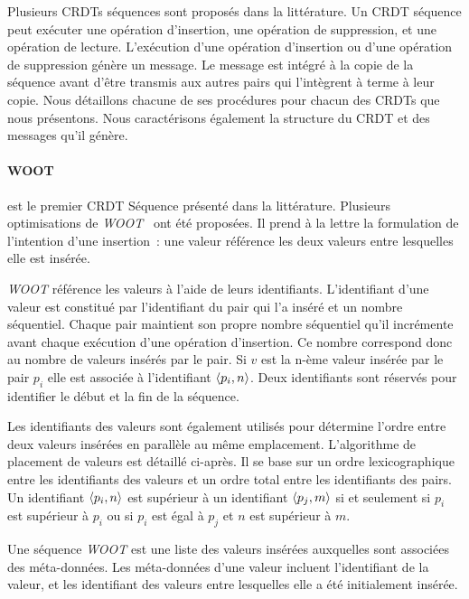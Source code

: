 Plusieurs \acp{CRDT} séquences sont proposés dans la littérature.
Un \ac{CRDT} séquence peut exécuter une opération d'insertion, une opération de suppression, et une opération de lecture.
L'exécution d'une opération d'insertion ou d'une opération de suppression génère un message.
Le message est intégré à la copie de la séquence avant d'être transmis aux autres pairs qui l'intègrent à terme à leur copie.
Nous détaillons chacune de ses procédures pour chacun des \acp{CRDT} que nous présentons.
Nous caractérisons également la structure du \ac{CRDT} et des messages qu'il génère.

\paragraph{WOOT}\autocite{oster_2006_woot} est le premier \ac{CRDT} Séquence présenté dans la littérature.
Plusieurs optimisations de \emph{WOOT}~\autocite{weiss2007wooki,ahmednacer2011evaluatingcrdts} ont été proposées.
Il prend à la lettre la formulation de l'intention d'une insertion~: une valeur référence les deux valeurs entre lesquelles elle est insérée.

\emph{WOOT} référence les valeurs à l'aide de leurs identifiants.
L'identifiant d'une valeur est constitué par l'identifiant du pair qui l'a inséré et un nombre séquentiel.
Chaque pair maintient son propre nombre séquentiel qu'il incrémente avant chaque exécution d'une opération d'insertion.
Ce nombre correspond donc au nombre de valeurs insérés par le pair.
Si $v$ est la n-ème valeur insérée par le pair $p_i$ elle est associée à l'identifiant $\tuple*{p_i, n}$.
Deux identifiants sont réservés pour identifier le début et la fin de la séquence.

Les identifiants des valeurs sont également utilisés pour détermine l'ordre entre deux valeurs insérées en parallèle au même emplacement.
L'algorithme de placement de valeurs est détaillé ci-après.
Il se base sur un ordre lexicographique entre les identifiants des valeurs et un ordre total entre les identifiants des pairs.
Un identifiant $\tuple*{p_i, n}$ est supérieur à un identifiant $\tuple*{p_j, m}$ si et seulement si $p_i$ est supérieur à $p_i$ ou si $p_i$ est égal à $p_j$ et $n$ est supérieur à $m$.

Une séquence \emph{WOOT} est une liste des valeurs insérées auxquelles sont associées des méta-données.
Les méta-données d'une valeur incluent l'identifiant de la valeur, et les identifiant des valeurs entre lesquelles elle a été initialement insérée.

